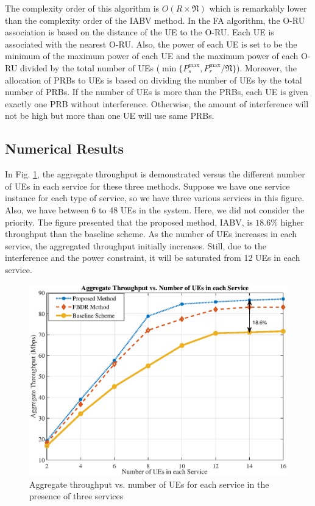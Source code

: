 \documentclass[conference]{IEEEtran}
\begin{document}
The complexity order of this algorithm is $O(R\times \mathfrak{N})$ which is remarkably lower than the complexity order of the IABV method.
In the FA algorithm, the O-RU association is based on the distance of the UE to the O-RU. 
Each UE is associated with the nearest O-RU. Also, the power of each UE is set to be the minimum of the maximum power of each UE and the maximum power of each O-RU divided by the total number of UEs ($\min\{P_s^{\max}, P_r^{\max}/\mathfrak{N}\}$).
Moreover, the allocation of PRBs to UEs is based on dividing the number of UEs by the total number of PRBs.
If the number of UEs is more than the PRBs, each UE is given exactly one PRB without interference. Otherwise, the amount of interference will not be high but more than one UE will use same PRBs.
\subsection{Numerical Results}
In Fig. \ref{fig:1}, the aggregate throughput is demonstrated versus the different number of UEs in each service for these three methods. Suppose we have one service instance for each type of service, so we have three various services in this figure. Also, we have between 6 to 48 UEs in the system.
Here, we did not consider the priority. The figure presented that the proposed method, IABV, is $18.6\%$ higher throughput than the baseline scheme.
As the number of UEs increases in each service, the aggregated throughput initially increases. Still, due to the interference and the power constraint, it will be saturated from 12 UEs in each service.
\begin{figure}
  \centering 
    \includegraphics[scale = 0.47]{Arate_ue1.eps}
  \caption{Aggregate throughput vs. number of UEs for each service in the presence of three services}
  \label{fig:1}
\end{figure}
\end{document}
